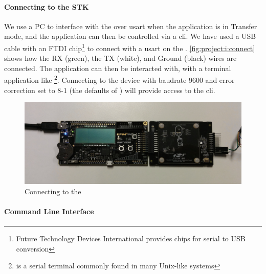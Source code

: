 

\paragraph{Connecting to the STK}

We use a PC to interface with the {\gecko} over \gls{usart} when the application is in Transfer mode, and the application can then be controlled via a \gls{cli}.
We have used a USB cable with an FTDI chip\footnote{Future Technology Devices International provides chips for serial to USB conversion} to connect with a \gls{usart} on the {\STK}.
\autoref{fig:project:i:connect} shows how the RX (green), the TX (white), and Ground (black) wires are connected.
The application can then be interacted with, with a terminal application like \footnote{ is a serial terminal commonly found in many Unix-like systems}.
Connecting to the device with baudrate 9600 and error correction set to 8-1 (the defaults of ) will provide access to the {\tracker} \gls{cli}.


\begin{figure}[H]
  \begin{center}
    \includegraphics[width=\textwidth]{figures/project-i-connect.jpg}
  \end{center}
  \caption{Connecting to the {\STK}}
  \label{fig:project:i:connect}
\end{figure}


\paragraph{Command Line Interface}

